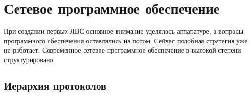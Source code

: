 \chapter{Сетевое программное обеспечение}

При создании первых ЛВС основное внимание уделялось аппаратуре, а вопросы программного обеспечения оставлялись на потом. Сейчас подобная стратегия уже не работает. Современное сетевое программное обеспечение в высокой степени структурировано.

\section{Иерархия протоколов}



